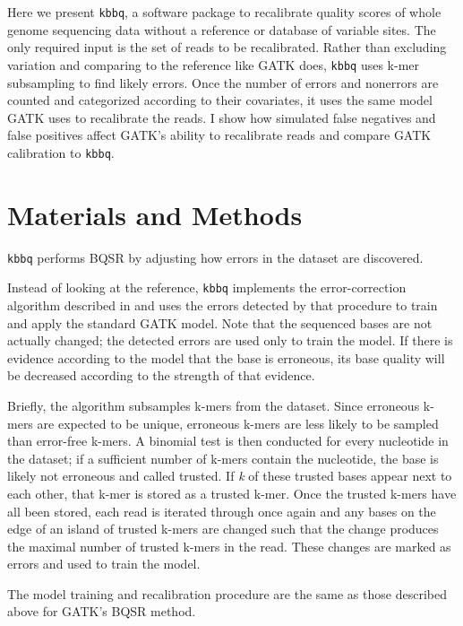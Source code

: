 \documentclass{article}
\begin{document}
\begin{outline}
\begin{outline}
		\end{outline}
	\item Here we present \texttt{kbbq}, a software package to recalibrate quality scores of whole genome sequencing data without a reference or database of variable sites. The only required input is the set of reads to be recalibrated. Rather than excluding variation and comparing to the reference like GATK does, \texttt{kbbq} uses k-mer subsampling to find likely errors. Once the number of errors and nonerrors are counted and categorized according to their covariates, it uses the same model GATK uses to recalibrate the reads. I show how simulated false negatives and false positives affect GATK's ability to recalibrate reads and compare GATK calibration to \texttt{kbbq}.
\end{outline}
\section{Materials and Methods}
\begin{outline}
	\item \texttt{kbbq} performs BQSR by adjusting how errors in the dataset are discovered.
	\begin{outline}
		\item Instead of looking at the reference, \texttt{kbbq} implements the error-correction algorithm described in \cite{song_lighter_2014} and uses the errors detected by that procedure to train and apply the standard GATK model. Note that the sequenced bases are not actually changed; the detected errors are used only to train the model. If there is evidence according to the model that the base is erroneous, its base quality will be decreased according to the strength of that evidence.
		\item Briefly, the algorithm subsamples k-mers from the dataset. Since erroneous k-mers are expected to be unique, erroneous k-mers are less likely to be sampled than error-free k-mers. A binomial test is then conducted for every nucleotide in the dataset; if a sufficient number of k-mers contain the nucleotide, the base is likely not erroneous and called trusted. If \textit{k} of these trusted bases appear next to each other, that k-mer is stored as a trusted k-mer. Once the trusted k-mers have all been stored, each read is iterated through once again and any bases on the edge of an island of trusted k-mers are changed such that the change produces the maximal number of trusted k-mers in the read. These changes are marked as errors and used to train the model.
		\item The model training and recalibration procedure are the same as those described above for GATK's BQSR method.
	\end{outline}
\end{outline}
\end{document}
